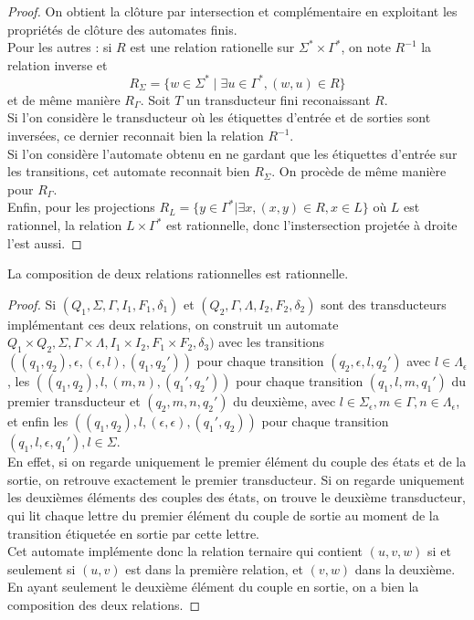 \documentclass{scrartcl}
\begin{document}
\begin{flushleft}
\begin{proof}
    On obtient la clôture par intersection et complémentaire en exploitant les propriétés de clôture des automates finis.\\
    Pour les autres : si $R$ est une relation rationelle sur $\Sigma^* \times \Gamma^*$, on note $R^{-1}$ la relation inverse et
    \[ R_{\Sigma} = \{ w \in \Sigma^* \mid \exists u \in \Gamma^*, (w, u) \in R \} \]
    et de même manière $R_{\Gamma}$. Soit $T$ un transducteur fini reconaissant $R$.\\
    Si l'on considère le transducteur où les étiquettes d'entrée et de sorties sont inversées, ce dernier reconnait bien la
    relation $R^{-1}$.\\
    Si l'on considère l'automate obtenu en ne gardant que les étiquettes d'entrée sur les transitions, cet automate reconnait bien $R_{\Sigma}$.
    On procède de même manière pour $R_{\Gamma}$.\\
    Enfin, pour les projections $R_L  = \{ y \in \Gamma^* | \exists x, (x, y) \in R, x \in L \}$ où $L$ est rationnel, la relation $L \times \Gamma^*$ est rationnelle, donc l'instersection projetée à droite l'est aussi.
\end{proof}

\begin{prop}
    La composition de deux relations rationnelles est rationnelle.
\end{prop}

\begin{proof}
    Si $(Q_1, \Sigma, \Gamma, I_1, F_1, \delta_1)$ et $(Q_2, \Gamma, \Lambda, I_2, F_2, \delta_2)$ sont des transducteurs implémentant ces deux relations, on construit un automate  $Q_1 \times Q_2, \Sigma, \Gamma \times \Lambda, I_1 \times I_2, F_1 \times F_2, \delta_3)$ avec les transitions $((q_1, q_2), \epsilon, (\epsilon, l), (q_1, q_2'))$ pour chaque transition $(q_2, \epsilon , l, q_2')$ avec $l \in \Lambda_\epsilon$, les $((q_1, q_2), l, (m, n), (q_1', q_2'))$ pour chaque transition $(q_1, l, m, q_1')$ du premier transducteur et $(q_2, m, n, q_2')$ du deuxième, avec $l \in \Sigma_\epsilon, m \in \Gamma, n \in \Lambda_\epsilon$, et enfin les $((q_1, q_2), l, (\epsilon, \epsilon), (q_1', q_2))$ pour chaque transition $(q_1, l, \epsilon, q_1'), l \in \Sigma$.\\
En effet, si on regarde uniquement le premier élément du couple des états et de la sortie, on retrouve exactement le premier transducteur. Si on regarde uniquement les deuxièmes éléments des couples des états, on trouve le deuxième transducteur, qui lit chaque lettre du premier élément du couple de sortie au moment de la transition étiquetée en sortie par cette lettre.\\
Cet automate implémente donc la relation ternaire qui contient $(u, v, w)$ si et seulement si $(u, v)$ est dans la première relation, et $(v, w)$ dans la deuxième. En ayant seulement le deuxième élément du couple en sortie, on a bien la composition des deux relations.
\end{proof}


\end{flushleft}
\end{document}
